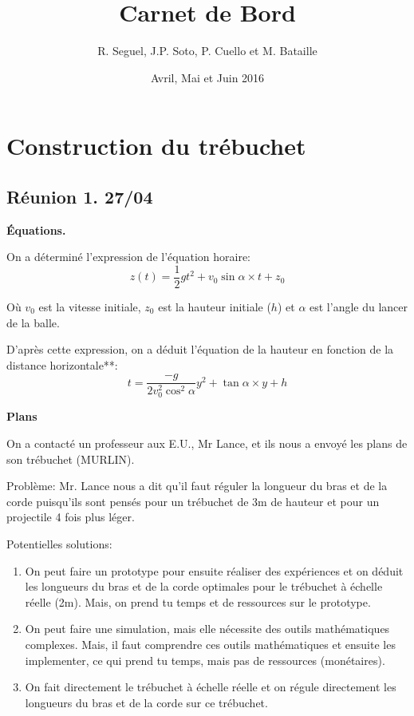 \documentclass[10pt]{article}
\begin{document}
 
\title{Carnet de Bord}
\author{R. Seguel, J.P. Soto, P. Cuello et M. Bataille}
\date{Avril, Mai et Juin 2016}
\maketitle

\tableofcontents

\pagebreak

\section{Construction du trébuchet}

\subsection{Réunion 1. 27/04}


{\bf Équations.}

On a déterminé
l'expression de l'équation horaire:
$$ z(t) = \frac{1}{2}gt^2+v_0\sin\alpha\times t+z_0$$

Où $v_0$ est la vitesse initiale, $z_0$ est la hauteur
initiale ($h$) et $\alpha$ est l'angle du lancer de la balle.

D'après cette expression, on a déduit l'équation de la
hauteur en fonction de la distance horizontale**:
$$ t=\frac{-g}{2v_0^2\cos^2\alpha}y^2+\tan\alpha\times y+h $$

{\bf Plans}

On a contacté un professeur aux E.U., Mr Lance, et ils nous
a envoyé les plans de son trébuchet (MURLIN).

Problème: Mr. Lance nous a dit qu'il faut réguler la
 longueur du bras et de la corde puisqu'ils sont pensés pour
 un trébuchet de 3m de hauteur et pour un projectile 4 fois plus léger.
 
 Potentielles solutions:
\begin{enumerate}
 \item On peut faire un prototype pour ensuite réaliser des expériences
 et on déduit les longueurs du bras et de la corde optimales
 pour le trébuchet à échelle réelle (2m). Mais, on prend tu temps
 et de ressources sur le prototype.
 \item  On peut faire une simulation, mais elle
 nécessite des outils mathématiques complexes. Mais, il faut comprendre ces outils mathématiques
 et ensuite les implementer, ce qui prend tu temps, mais pas
 de ressources (monétaires).
 \item  On fait directement le trébuchet à échelle
 réelle et on régule directement les longueurs du bras et de
 la corde sur ce trébuchet.
\end{enumerate}
\end{document}

